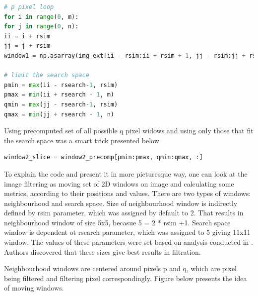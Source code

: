 \begin{lstlisting}[language=Python, caption = Calculation of p pixel window and search space area.]
# p pixel loop
for i in range(0, m):
for j in range(0, n):
ii = i + rsim
jj = j + rsim
window1 = np.asarray(img_ext[ii - rsim:ii + rsim + 1, jj - rsim:jj + rsim + 1])

# limit the search space
pmin = max(ii - rsearch-1, rsim)
pmax = min(ii + rsearch - 1, m)
qmin = max(jj - rsearch-1, rsim)
qmax = min(jj + rsearch - 1, n)
\end{lstlisting}

Using precomputed set of all possible q pixel widows and using only those that fit the search space was a smart trick presented below.

\begin{lstlisting}[language=Python, caption = Calculation of q pixel windows within search space area.]
window2_slice = window2_precomp[pmin:pmax, qmin:qmax, :]
\end{lstlisting}

To explain the code and present it in more picturesque way, one can look at the image filtering as moving set of
2D windows on image and calculating some metrics, according to their positions and values. There are two types of windows: neighbourhood and search space. Size of neighbourhood window is indirectly defined by rsim parameter, which was assigned by default to 2. That results in neighbourhood window of size 5x5, becasue 5 = 2 * rsim +1. Search space window is dependent ot rsearch parameter, which was assigned to 5 giving 11x11 window. The values of these parameters were set based on analysis conducted in \cite{5a1}. Authors discovered that these sizes give best results in filtration.

Neighbourhood windows are centered around pixels p and q, which are pixel being filtered and filtering pixel correspondingly. Figure below presents the idea of moving windows.

